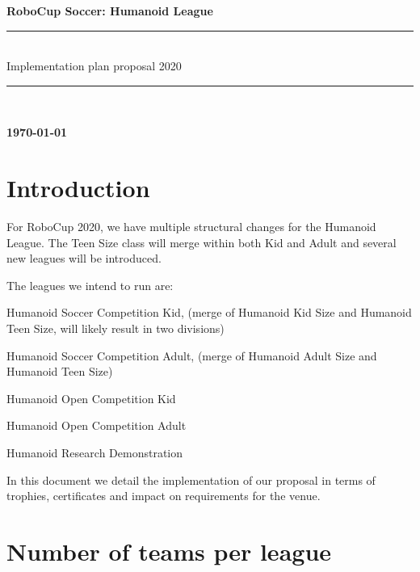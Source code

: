 \documentclass{article}
\begin{document}
\begin{center}
  {\Huge \bfseries
    RoboCup Soccer: Humanoid League
    \\
    \rule{\textwidth}{0.1cm}\\
    \vspace{0.5cm}
    Implementation plan proposal 2020\\
    \vspace{0.5cm}
    \rule{\textwidth}{0.1cm}\\
  }
  {\bfseries \today}
\end{center}

\newpage

\section{Introduction}

For RoboCup 2020, we have multiple structural changes for the Humanoid League.
The Teen Size class will merge within both Kid and Adult and several new leagues
will be introduced.

The leagues we intend to run are:

\begin{description}[leftmargin=5em,style=nextline]
\item[HSCK:] Humanoid Soccer Competition Kid, (merge of Humanoid Kid Size and
  Humanoid Teen Size, will likely result in two divisions)
\item[HSCA:] Humanoid Soccer Competition Adult, (merge of Humanoid Adult Size
  and Humanoid Teen Size)
\item[HOCK:] {Humanoid Open Competition Kid}
\item[HOCA:] {Humanoid Open Competition Adult}
\item[HRD:] {Humanoid Research Demonstration}
\end{description}

In this document we detail the implementation of our proposal in terms of
trophies, certificates and impact on requirements for the venue.

\section{Number of teams per league}
\end{document}
